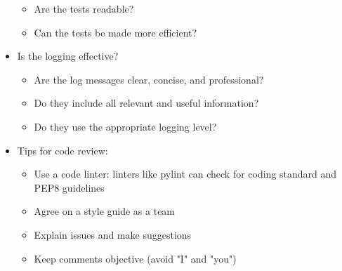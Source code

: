 \begin{itemize}
\begin{itemize}
		\item Are the tests readable?
		\item Can the tests be made more efficient?
	\end{itemize}
	\item Is the logging effective?
	\begin{itemize}
		\item Are the log messages clear, concise, and professional?
		\item Do they include all relevant and useful information?
		\item Do they use the appropriate logging level?
	\end{itemize}
	\item Tips for code review:
	\begin{itemize}
		\item Use a code linter: linters like pylint can check for coding standard and PEP8 guidelines
		\item Agree on a style guide as a team
		\item Explain issues and make suggestions
		\item Keep comments objective (avoid "I" and "you")
	\end{itemize}
\end{itemize}